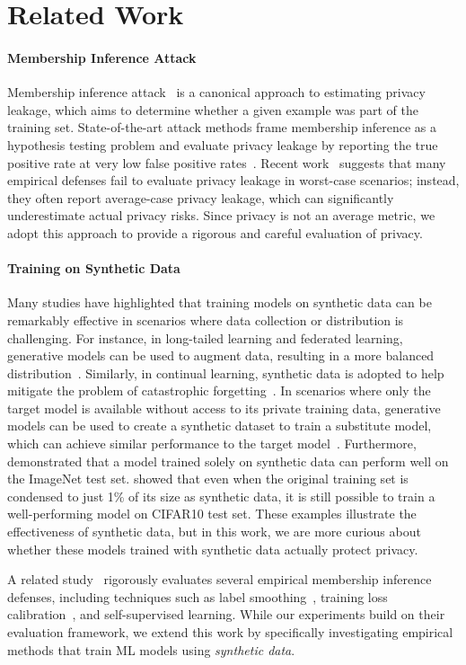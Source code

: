 \section{Related Work}
\paragraph{Membership Inference Attack}
Membership inference attack~\citep{shokri2017membership} is a canonical approach to estimating privacy leakage, which aims to determine whether a given example was part of the training set. State-of-the-art attack methods frame membership inference as a hypothesis testing problem and evaluate privacy leakage by reporting the true positive rate at very low false positive rates~\citep{lira}. Recent work~\citep{aerni2024evaluations} suggests that many empirical defenses fail to evaluate privacy leakage in worst-case scenarios; instead, they often report average-case privacy leakage, which can significantly underestimate actual privacy risks. Since privacy is not an average metric, we adopt this approach to provide a rigorous and careful evaluation of privacy. 


\paragraph{Training on Synthetic Data} 
Many studies have highlighted that training models on synthetic data can be remarkably effective in scenarios where data collection or distribution is challenging. 
For instance, in long-tailed learning and federated learning, generative models can be used to augment data, resulting in a more balanced distribution~\citep{shin2023fill,fgl}. Similarly, in continual learning, synthetic data is adopted to help mitigate the problem of catastrophic forgetting~\citep{diffclass,zhang2023target,shin2017continual}.
In scenarios where only the target model is available without access to its private training data, generative models can be used to create a synthetic dataset to train a substitute model, which can achieve similar performance to the target model~\citep{zhang2023ideal,lopes2017data}. Furthermore,~\citet{realfake} demonstrated that a model trained solely on synthetic data can perform well on the ImageNet test set. \citet{cazenavette2022dataset,guo2024lossless} showed that even when the original training set is condensed to just 1\% of its size as synthetic data, it is still possible to train a well-performing model on CIFAR10 test set. 
These examples illustrate the effectiveness of synthetic data, but in this work, we are more curious about whether these models trained with synthetic data actually protect privacy.

A related study~\cite{aerni2024evaluations} rigorously evaluates several empirical membership inference defenses, including techniques such as label smoothing~\cite{chen2024hamp}, training loss calibration~\cite{chen2022relaxloss}, and self-supervised learning. While our experiments build on their evaluation framework, we extend this work by specifically investigating empirical methods that train ML models using \textit{synthetic data}.